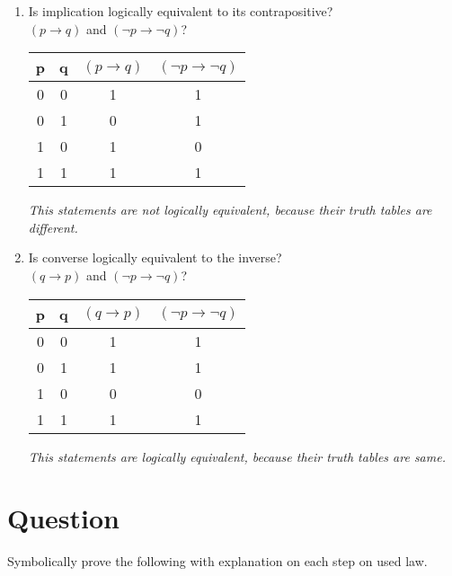 \documentclass[a4paper,11pt]{article}
\begin{document}
\begin{enumerate}[label=\alph*)]
  \item
  Is implication logically equivalent to its contrapositive?\\
  $(p \rightarrow q)$ and $(\neg p \rightarrow \neg q)$?

  \begin{tabular}{|cc|cc|}
    \hline
    p & q & $(p \rightarrow q)$ & $(\neg p \rightarrow \neg q)$\\
    \hline
    0 & 0 & 1 & 1\\
    0 & 1 & 0 & 1\\
    1 & 0 & 1 & 0\\
    1 & 1 & 1 & 1\\
    \hline
  \end{tabular}

  \emph{This statements are not logically equivalent, because their truth tables are different.}

  \item
  Is converse logically equivalent to the inverse?\\
  $(q \rightarrow p)$ and $(\neg p \rightarrow \neg q)$?

  \begin{tabular}{|cc|cc|}
    \hline
    p & q & $(q \rightarrow p)$ & $(\neg p \rightarrow \neg q)$\\
    \hline
    0 & 0 & 1 & 1\\
    0 & 1 & 1 & 1\\
    1 & 0 & 0 & 0\\
    1 & 1 & 1 & 1\\
    \hline
  \end{tabular}

  \emph{This statements are logically equivalent, because their truth tables are same.}

\end{enumerate}

\section{Question}
\label{sec:Question}
Symbolically prove the following with explanation on each step on used law.
\end{document}
